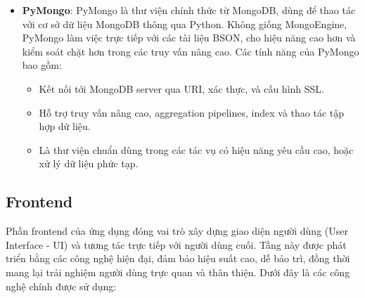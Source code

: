 \begin{itemize}
    \item \textbf{PyMongo}:
    PyMongo là thư viện chính thức từ MongoDB, dùng để thao tác với cơ sở dữ liệu MongoDB thông qua Python. Không giống MongoEngine, PyMongo làm việc trực tiếp với các tài liệu BSON, cho hiệu năng cao hơn và kiểm soát chặt hơn trong các truy vấn nâng cao. Các tính năng của PyMongo bao gồm:
    \begin{itemize}
        \item Kết nối tới MongoDB server qua URI, xác thực, và cấu hình SSL.
        \item Hỗ trợ truy vấn nâng cao, aggregation pipelines, index và thao tác tập hợp dữ liệu.
        \item Là thư viện chuẩn dùng trong các tác vụ có hiệu năng yêu cầu cao, hoặc xử lý dữ liệu phức tạp.
    \end{itemize}

\end{itemize}


\subsection{Frontend}

Phần frontend của ứng dụng đóng vai trò xây dựng giao diện người dùng (User Interface - UI) và tương tác trực tiếp với người dùng cuối. Tầng này được phát triển bằng các công nghệ hiện đại, đảm bảo hiệu suất cao, dễ bảo trì, đồng thời mang lại trải nghiệm người dùng trực quan và thân thiện. Dưới đây là các công nghệ chính được sử dụng:

